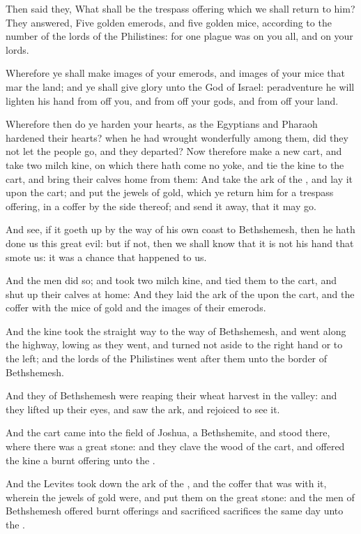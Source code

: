 \verse Then said they, What shall be the trespass offering which we shall return to him? They answered, Five golden emerods, and five golden mice, according to the number of the lords of the Philistines: for one plague was on you all, and on your lords.

\verse Wherefore ye shall make images of your emerods, and images of your mice that mar the land; and ye shall give glory unto the God of Israel: peradventure he will lighten his hand from off you, and from off your gods, and from off your land.

\verse Wherefore then do ye harden your hearts, as the Egyptians and Pharaoh hardened their hearts? when he had wrought wonderfully among them, did they not let the people go, and they departed?  \verse Now therefore make a new cart, and take two milch kine, on which there hath come no yoke, and tie the kine to the cart, and bring their calves home from them: \verse And take the ark of the \LORD, and lay it upon the cart; and put the jewels of gold, which ye return him for a trespass offering, in a coffer by the side thereof; and send it away, that it may go.

\verse And see, if it goeth up by the way of his own coast to Bethshemesh, then he hath done us this great evil: but if not, then we shall know that it is not his hand that smote us: it was a chance that happened to us.

\verse And the men did so; and took two milch kine, and tied them to the cart, and shut up their calves at home: \verse And they laid the ark of the \LORD upon the cart, and the coffer with the mice of gold and the images of their emerods.

\verse And the kine took the straight way to the way of Bethshemesh, and went along the highway, lowing as they went, and turned not aside to the right hand or to the left; and the lords of the Philistines went after them unto the border of Bethshemesh.

\verse And they of Bethshemesh were reaping their wheat harvest in the valley: and they lifted up their eyes, and saw the ark, and rejoiced to see it.

\verse And the cart came into the field of Joshua, a Bethshemite, and stood there, where there was a great stone: and they clave the wood of the cart, and offered the kine a burnt offering unto the \LORD.

\verse And the Levites took down the ark of the \LORD, and the coffer that was with it, wherein the jewels of gold were, and put them on the great stone: and the men of Bethshemesh offered burnt offerings and sacrificed sacrifices the same day unto the \LORD.

